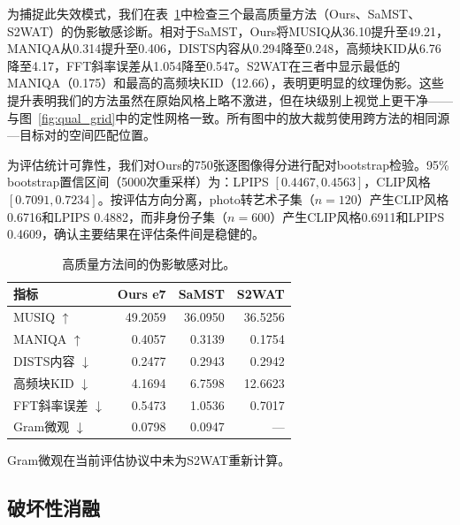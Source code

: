\documentclass[letterpaper]{article}
\begin{document}
为捕捉此失效模式，我们在表~\ref{tab:artifact}中检查三个最高质量方法（Ours、SaMST、S2WAT）的伪影敏感诊断。相对于SaMST，Ours将MUSIQ从36.10提升至49.21，MANIQA从0.314提升至0.406，DISTS内容从0.294降至0.248，高频块KID从6.76降至4.17，FFT斜率误差从1.054降至0.547。S2WAT在三者中显示最低的MANIQA（0.175）和最高的高频块KID（12.66），表明更明显的纹理伪影。这些提升表明我们的方法虽然在原始风格上略不激进，但在块级别上视觉上更干净——与图~\ref{fig:qual_grid}中的定性网格一致。所有图中的放大裁剪使用跨方法的相同源—目标对的空间匹配位置。

为评估统计可靠性，我们对Ours的750张逐图像得分进行配对bootstrap检验。95\% bootstrap置信区间（5000次重采样）为：LPIPS $[0.4467, 0.4563]$，CLIP风格 $[0.7091, 0.7234]$。按评估方向分离，photo转艺术子集（$n=120$）产生CLIP风格0.6716和LPIPS 0.4882，而非身份子集（$n=600$）产生CLIP风格0.6911和LPIPS 0.4609，确认主要结果在评估条件间是稳健的。

\begin{table}[t]
\centering
\caption{高质量方法间的伪影敏感对比。}
\label{tab:artifact}
\begin{tabular}{lrrr}
\toprule
指标 & Ours e7 & SaMST & S2WAT \\
\midrule
MUSIQ $\uparrow$ & 49.2059 & 36.0950 & 36.5256 \\
MANIQA $\uparrow$ & 0.4057 & 0.3139 & 0.1754 \\
DISTS内容 $\downarrow$ & 0.2477 & 0.2943 & 0.2942 \\
高频块KID $\downarrow$ & 4.1694 & 6.7598 & 12.6623 \\
FFT斜率误差 $\downarrow$ & 0.5473 & 1.0536 & 0.7017 \\
Gram微观 $\downarrow$ & 0.0798 & 0.0947 & --- \\
\bottomrule
\end{tabular}
\smallskip
\footnoterule\small
Gram微观在当前评估协议中未为S2WAT重新计算。
\end{table}

\subsection{破坏性消融}
\begin{table}[t]
\centering
\caption{严格750协议下的破坏性消融。}
\label{tab:ablation}
\end{table}
\end{document}
